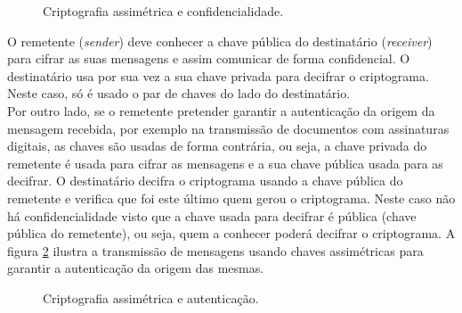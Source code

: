 \documentclass[a4paper,11pt,openright,oneside]{report}
\begin{document}
\begin{figure}[ht]
\center
{}
\caption{Criptografia assimétrica e confidencialidade.}
\label{fig:crypto3}
\end{figure}

O remetente (\textit{sender}) deve conhecer a chave pública do destinatário (\textit{receiver}) para cifrar as suas mensagens e assim comunicar de forma confidencial. O destinatário usa por sua vez a sua chave privada para decifrar o criptograma. Neste caso, só é usado o par de chaves do lado do destinatário.\\

Por outro lado, se o remetente pretender garantir a autenticação da origem da mensagem recebida, por exemplo na transmissão de documentos com assinaturas digitais, as chaves são usadas de forma contrária, ou seja, a chave privada do remetente é usada para cifrar as mensagens e a sua chave pública usada para as decifrar. O destinatário decifra o criptograma usando a chave pública do remetente e verifica que foi este último quem gerou o criptograma. Neste caso não há confidencialidade visto que a chave usada para decifrar é pública (chave pública do remetente), ou seja, quem a conhecer poderá decifrar o criptograma. A figura \ref{fig:crypto4} ilustra a transmissão de mensagens usando chaves assimétricas para garantir a autenticação da origem das mesmas.\\

\begin{figure}[ht]
\center
{}
\caption{Criptografia assimétrica e autenticação.}
\label{fig:crypto4}
\end{figure}
\end{document}
